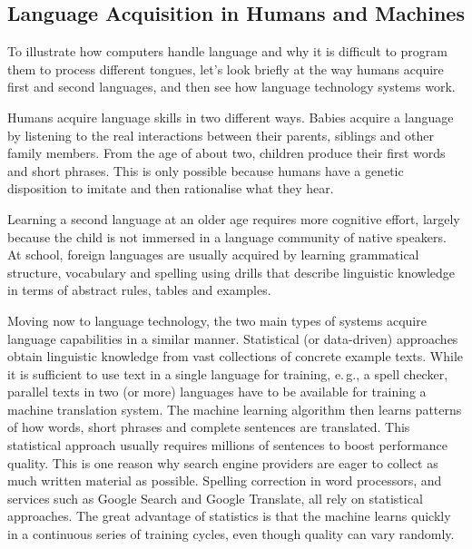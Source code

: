 \begin{multicols}{2}

\subsection{Language Acquisition in Humans and Machines}

To illustrate how computers handle language and why it is difficult to program them to process different tongues, let’s look briefly at the way humans acquire first and second languages, and then see how language technology systems work.

Humans acquire language skills in two different ways. Babies acquire a language by listening to the real interactions between their parents, siblings and other family members. From the age of about two, children produce their first words and short phrases. This is only possible because humans have a genetic disposition to imitate and then rationalise what they hear. 

Learning a second language at an older age requires more cognitive effort, largely because the child is not immersed in a language community of native speakers. At school, foreign languages are usually acquired by learning grammatical structure, vocabulary and spelling using drills that describe linguistic knowledge in terms of abstract rules, tables and examples.


Moving now to language technology, the two main types of systems acquire language capabilities in a similar manner. Statistical (or data-driven) approaches obtain linguistic knowledge from vast collections of concrete example texts. While it is sufficient to use text in a single language for training, e.\,g., a spell checker, parallel texts in two (or more) languages have to be available for training a machine translation system. The machine learning algorithm then learns patterns of how words, short phrases and complete sentences are translated.
This statistical approach usually requires millions of sentences to boost performance quality. This is one reason why search engine providers are eager to collect as much written material as possible. Spelling correction in word processors, and services such as Google Search and Google Translate, all rely on statistical approaches. The great advantage of statistics is that the machine learns quickly in a continuous series of training cycles, even though quality can vary randomly.


\end{multicols}
